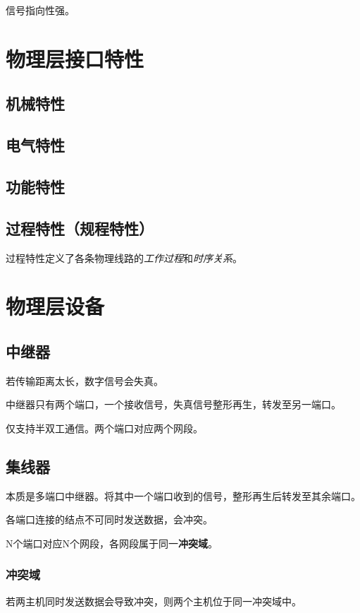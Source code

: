 信号指向性强。


\section{物理层接口特性}

\subsection{机械特性}


\subsection{电气特性}


\subsection{功能特性}


\subsection{过程特性（规程特性）}
过程特性定义了各条物理线路的\textit{工作过程}和\textit{时序关系}。


\section{物理层设备}

\subsection{中继器}
若传输距离太长，数字信号会失真。

中继器只有两个端口，一个接收信号，失真信号整形再生，转发至另一端口。

仅支持半双工通信。两个端口对应两个网段。


\subsection{集线器}
本质是多端口中继器。将其中一个端口收到的信号，整形再生后转发至其余端口。

各端口连接的结点不可同时发送数据，会冲突。

N个端口对应N个网段，各网段属于同一\textbf{冲突域}。


\subsubsection{冲突域}
若两主机同时发送数据会导致冲突，则两个主机位于同一冲突域中。

